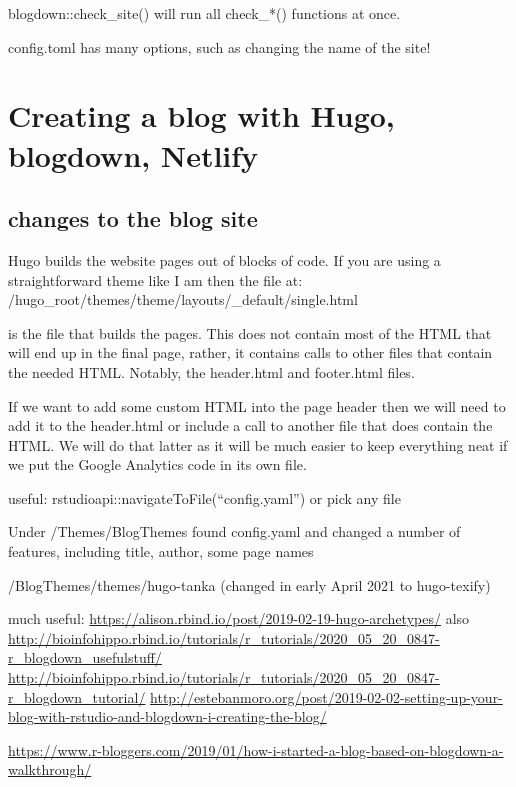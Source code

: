\documentclass[
]{article}
\begin{document}
blogdown::check\_site() will run all check\_*() functions at once.

config.toml has many options, such as changing the name of the site!

\newpage

\hypertarget{creating-a-blog-with-hugo-blogdown-netlify}{%
\section{Creating a blog with Hugo, blogdown,
Netlify}\label{creating-a-blog-with-hugo-blogdown-netlify}}

\hypertarget{changes-to-the-blog-site}{%
\subsection{changes to the blog site}\label{changes-to-the-blog-site}}

Hugo builds the website pages out of blocks of code. If you are using a
straightforward theme like I am then the file at:
/hugo\_root/themes/theme/layouts/\_default/single.html

is the file that builds the pages. This does not contain most of the
HTML that will end up in the final page, rather, it contains calls to
other files that contain the needed HTML. Notably, the header.html and
footer.html files.

If we want to add some custom HTML into the page header then we will
need to add it to the header.html or include a call to another file that
does contain the HTML. We will do that latter as it will be much easier
to keep everything neat if we put the Google Analytics code in its own
file.

useful: rstudioapi::navigateToFile(``config.yaml'') or pick any file

Under /Themes/BlogThemes found config.yaml and changed a number of
features, including title, author, some page names

/BlogThemes/themes/hugo-tanka (changed in early April 2021 to
hugo-texify)

much useful:
\url{https://alison.rbind.io/post/2019-02-19-hugo-archetypes/} also
\url{http://bioinfohippo.rbind.io/tutorials/r_tutorials/2020_05_20_0847-r_blogdown_usefulstuff/}
\url{http://bioinfohippo.rbind.io/tutorials/r_tutorials/2020_05_20_0847-r_blogdown_tutorial/}
\url{http://estebanmoro.org/post/2019-02-02-setting-up-your-blog-with-rstudio-and-blogdown-i-creating-the-blog/}

\url{https://www.r-bloggers.com/2019/01/how-i-started-a-blog-based-on-blogdown-a-walkthrough/}
\end{document}
